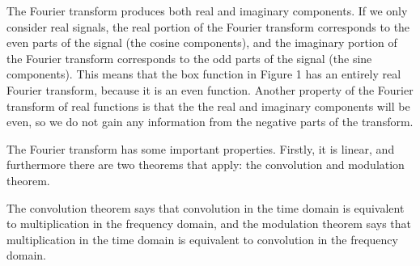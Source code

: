 \documentclass[12pt]{article}
\begin{document}
\begin{minipage}{\textwidth}
\begin{minipage}{.5\textwidth}
\end{minipage}%
\begin{minipage}{.5\textwidth}
\end{minipage}
\centering
\end{minipage}

The Fourier transform produces both real and imaginary components. If we only consider real signals, the real portion of the Fourier transform corresponds to the even parts of the signal (the cosine components), and the imaginary portion of the Fourier transform corresponds to the odd parts of the signal (the sine components). This means that the box function in Figure 1 has an entirely real Fourier transform, because it is an even function. Another property of the Fourier transform of real functions is that the the real and imaginary components will be even, so we do not gain any information from the negative parts of the transform.

The Fourier transform has some important properties. Firstly, it is linear, and furthermore there are two theorems that apply: the convolution and modulation theorem.

The convolution theorem says that convolution in the time domain is equivalent to multiplication in the frequency domain, and the modulation theorem says that multiplication in the time domain is equivalent to convolution in the frequency domain.
\end{document}
